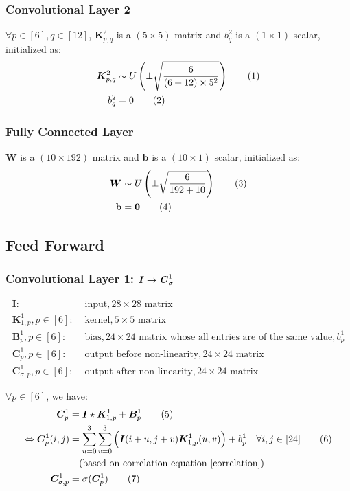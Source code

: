 \documentclass[12pt]{article}
\renewcommand{\vec}[1]{\mathbf{#1}}
\newcommand\numberthis{\stepcounter{equation}\tag{\theequation}}
\begin{document}
\subsubsection{Convolutional Layer 2}
$\forall p \in [6], q \in [12]$, $\bm{K}^2_{p,q}$ is a $(5 \times 5)$ matrix and $b^2_q$ is a $(1 \times 1)$ scalar, initialized as:
\begin{align*}
    \bm{K}^2_{p,q} &\sim U\left(\pm \sqrt{\frac{6}{(6 + 12) \times 5^2}}\right)
    \numberthis
    \\
    b^2_q &= 0
    \numberthis
\end{align*}
\subsubsection{Fully Connected Layer}
$\bm{W}$ is a $(10 \times 192)$ matrix and $\vec{b}$ is a $(10 \times 1)$ scalar, initialized as:
\begin{align*}
    \bm{W} &\sim U\left(\pm \sqrt{\frac{6}{192 + 10}}\right)
    \numberthis
    \\
    \vec{b} &= \vec{0}
    \numberthis
\end{align*}

\subsection{Feed Forward}
\subsubsection{Convolutional Layer 1: $\textbf{\textit{I}} \rightarrow \textbf{\textit{C}}^1_\sigma$}

\begin{align*}
    \bm{I}:& \text{ input}, 28 \times 28 \text{ matrix}\\
    \bm{K}^1_{1, p}, p \in [6]:& \text{ kernel}, 5 \times 5 \text{ matrix}\\
    \bm{B}^1_p, p \in [6]:& \text{ bias}, 24 \times 24 \text{ matrix whose all entries are of the same value}, b^1_p\\
    \bm{C}^1_p, p \in [6]:& \text{ output before non-linearity}, 24 \times 24 \text{ matrix}\\
    \bm{C}^1_{\sigma, p}, p \in [6]:& \text{ output after non-linearity}, 24 \times 24 \text{ matrix}
\end{align*}

$\forall p \in [6]$, we have:
\begin{align*}
    \bm{C}^1_p &= \bm{I} \star \bm{K}^1_{1, p} + \bm{B}^1_p
    \numberthis \label{C1}
    \\
    \Leftrightarrow \bm{C}^1_p(i, j) &= \sum_{u = 0}^3\sum_{v = 0}^3\Big(\bm{I}(i + u, j + v)\bm{K}^1_{1,p}(u, v)\Big) + b^1_p \quad \forall i, j \in [24]
    \numberthis \label{C1_indexbased}
    \\
    &\quad(\text{based on correlation equation } \eqref{correlation})
    \\
    \bm{C}^1_{\sigma, p} &= \sigma(\bm{C}^1_p)
    \numberthis \label{C1_sigma}
\end{align*}
\end{document}
